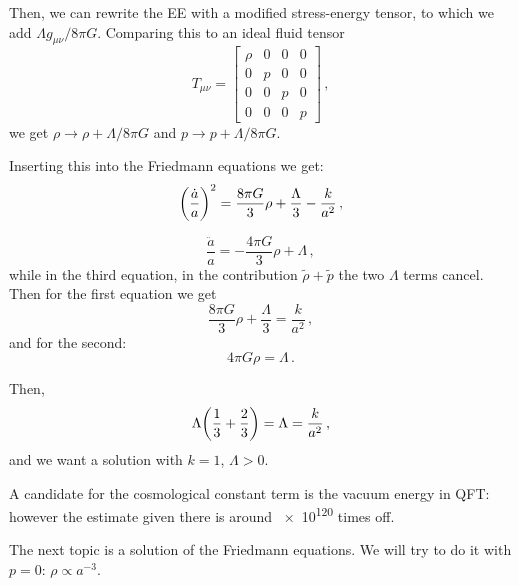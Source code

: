 \documentclass[main.tex]{subfiles}
\begin{document}
Then, we can rewrite the EE with a modified stress-energy tensor, to which we add \(\Lambda g_{\mu \nu } / 8 \pi G\). Comparing this to an ideal fluid tensor 
%
\begin{equation}
  T_{\mu \nu } = \left[\begin{array}{cccc}
  \rho & 0 & 0 & 0 \\ 
  0 & p & 0 & 0 \\ 
  0 & 0 & p & 0 \\ 
  0 & 0 & 0 & p
  \end{array}\right]
\,,
\end{equation}
%
we get \(\rho \rightarrow \rho + \Lambda/ 8 \pi G \) and \(p \rightarrow p + \Lambda  / 8 \pi G\).

Inserting this into the Friedmann equations we get: 
%
\begin{equation}
  \qty(\frac{\dot{a} }{a})^2= 
  \frac{8 \pi G}{3} \rho + \frac{\Lambda }{3}
  - \frac{k}{a^2}
\,,
\end{equation}
%

%
\begin{equation}
  \frac{\ddot{a}}{a} = - \frac{4 \pi G}{3} \rho + \Lambda 
\,,
\end{equation}
%
while in the third equation, in the contribution \(\widetilde{\rho }  + \widetilde{p} \) the two \(\Lambda \) terms cancel. Then for the first equation we get 
%
\begin{equation}
  \frac{8 \pi G}{3} \rho + \frac{\Lambda}{3} = \frac{k}{a^2}
\,,
\end{equation}
%
and for the second: 
%
\begin{equation}
  4 \pi G \rho = \Lambda 
\,.
\end{equation}

Then, 
%
\begin{equation}
  \Lambda \qty(\frac{1}{3}+ \frac{2}{3}) = \Lambda = \frac{k}{a^2}
\,,
\end{equation}
%
and we want a solution with \(k=1\), \(\Lambda > 0\).

A candidate for the cosmological constant term is the vacuum energy in QFT: however the estimate given there is around \num{e120} times off.

The next topic is a solution of the Friedmann equations.
We will try to do it with \(p=0\): \(\rho \propto a^{-3}\).
\end{document}
